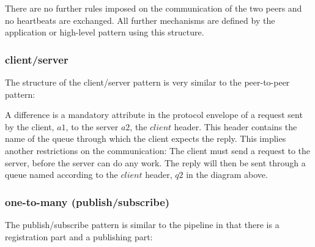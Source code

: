 \documentclass[a4paper]{scrartcl}
\newcommand{\menqAll}{\triangleleft}
\newcommand{\connect}[2]{
\draw [->,color=black] (#1) to (#2)
}
\begin{document}

There are no further rules imposed on the communication
of the two peers and no heartbeats are exchanged.
All further mechanisms are defined by the application
or high-level pattern using this structure.

\subsubsection{client/server}\label{subsub:cs}
The structure of the client/server pattern 
is very similar to the peer-to-peer pattern:


A difference is a mandatory attribute in the protocol envelope
of a request sent by the client, $a1$, to the server $a2$,
the $client$ header.
This header contains the name of the queue
through which the client expects the reply.
This implies another restrictions on the communication:
The client must send a request to the server,
before the server can do any work.
The reply will then be sent through a queue
named according to the $client$ header,
$q2$ in the diagram above.

\subsubsection{one-to-many (publish/subscribe)}\label{subsub:pub}
The publish/subscribe pattern is similar
to the pipeline in that there is a registration
part and a publishing part:

\end{document}
